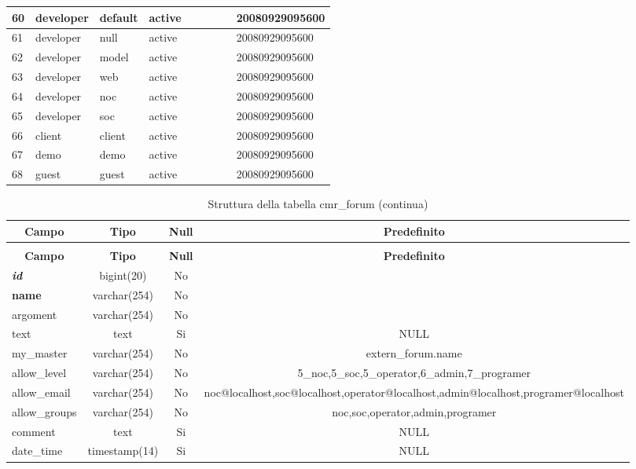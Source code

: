 \begin{longtable}{|l|l|l|l|l|l|l|l|l|}
60 & developer & default & active &  &  &  &  & 20080929095600 \\ \hline 
61 & developer & null & active &  &  &  &  & 20080929095600 \\ \hline 
62 & developer & model & active &  &  &  &  & 20080929095600 \\ \hline 
63 & developer & web & active &  &  &  &  & 20080929095600 \\ \hline 
64 & developer & noc & active &  &  &  &  & 20080929095600 \\ \hline 
65 & developer & soc & active &  &  &  &  & 20080929095600 \\ \hline 
66 & client & client & active &  &  &  &  & 20080929095600 \\ \hline 
67 & demo & demo & active &  &  &  &  & 20080929095600 \\ \hline 
68 & guest & guest & active &  &  &  &  & 20080929095600 \\ \hline 
 \end{longtable}

%
%
 \begin{longtable}{|l|c|c|c|} 
 \caption{Struttura della tabella cmr\_forum} \label{tab:cmr_forum-structure} \\
 \hline \multicolumn{1}{|c|}{\textbf{Campo}} & \multicolumn{1}{|c|}{\textbf{Tipo}} & \multicolumn{1}{|c|}{\textbf{Null}} & \multicolumn{1}{|c|}{\textbf{Predefinito}} \\ \hline \hline
\endfirsthead
 \caption{Struttura della tabella cmr\_forum (continua)} \\ 
 \hline \multicolumn{1}{|c|}{\textbf{Campo}} & \multicolumn{1}{|c|}{\textbf{Tipo}} & \multicolumn{1}{|c|}{\textbf{Null}} & \multicolumn{1}{|c|}{\textbf{Predefinito}} \\ \hline \hline \endhead \endfoot \textbf{\textit{id}} & bigint(20) &  No  &  \\ \hline 
\textbf{name} & varchar(254) &  No  &  \\ \hline 
argoment & varchar(254) &  No  &  \\ \hline 
text & text &  Si  & NULL \\ \hline 
my\_master & varchar(254) &  No  & extern\_forum.name \\ \hline 
allow\_level & varchar(254) &  No  & 5\_noc,5\_soc,5\_operator,6\_admin,7\_programer \\ \hline 
allow\_email & varchar(254) &  No  & noc@localhost,soc@localhost,operator@localhost,admin@localhost,programer@localhost \\ \hline 
allow\_groups & varchar(254) &  No  & noc,soc,operator,admin,programer \\ \hline 
comment & text &  Si  & NULL \\ \hline 
date\_time & timestamp(14) &  Si  & NULL \\ \hline 
 \end{longtable}

